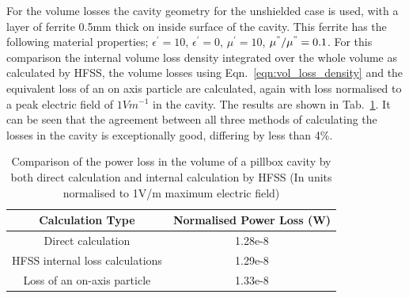 For the volume losses the cavity geometry for the unshielded case is used, with a layer of ferrite 0.5mm thick on inside surface of the cavity. This ferrite has the following material properties; $\epsilon^{'} = 10$, $\epsilon^{'}=0$, $\mu^{'}=10$, $\mu^{"} / \mu^{"} = 0.1$. For this comparison the internal volume loss density integrated over the whole volume as calculated by HFSS, the volume losses using Eqn.~\ref{eqn:vol_loss_density} and the equivalent loss of an on axis particle are calculated, again with loss normalised to a peak electric field of $1 V m^{-1}$ in the cavity. The results are shown in Tab.~\ref{tab:volume_losses_ferr}. It can be seen that the agreement between all three methods of calculating the losses in the cavity is exceptionally good, differing by less than 4\%.

\begin{table}
\caption{Comparison of the power loss in the volume of a pillbox cavity by both direct calculation and internal calculation by HFSS (In units normalised to 1V/m maximum electric field)}
\begin{center}
\begin{tabular}{c | c }
Calculation Type & Normalised Power Loss (W)\\ \hline
Direct calculation & 1.28e-8\\ \hline
HFSS internal loss calculations & 1.29e-8 \\ \hline
Loss of an on-axis particle & 1.33e-8 \\
\end{tabular}
\end{center}
\label{tab:volume_losses_ferr}
\end{table}



